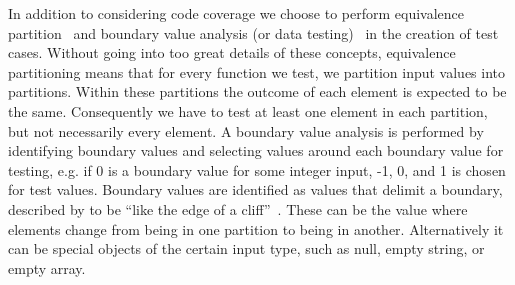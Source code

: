 In addition to considering code coverage we choose to perform equivalence partition~\cite[pp.~67-69]{Patton05} and boundary value analysis (or data testing)~\cite[pp.~70-79]{Patton05} in the creation of test cases.
Without going into too great details of these concepts, equivalence partitioning means that for every function we test, we partition input values into partitions.
Within these partitions the outcome of each element is expected to be the same.
Consequently we have to test at least one element in each partition, but not necessarily every element.
A boundary value analysis is performed by identifying boundary values and selecting values around each boundary value for testing, e.g. if 0 is a boundary value for some integer input, -1, 0, and 1 is chosen for test values.
Boundary values are identified as values that delimit a boundary, described by \citeauthor{Patton05} to be ``like the edge of a cliff''~\cite[p.~71]{Patton05}.
These can be the value where elements change from being in one partition to being in another.
Alternatively it can be special objects of the certain input type, such as null, empty string, or empty array.